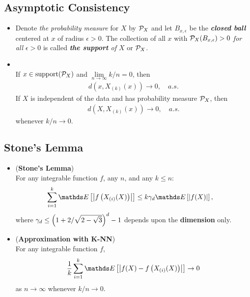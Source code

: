 \documentclass[11pt]{article}
\begin{document}
\subsection{Asymptotic Consistency}
\begin{itemize}
\item \begin{definition}
Denote \emph{the probability measure} for $X$ by ${\mathcal P}_{X}$ and let $B_{x, \epsilon}$ be the \emph{\textbf{closed ball}} centered at $x$ of radius $\epsilon > 0$. The collection of all $x$ with ${\mathcal P}_{X}(B_{x ,\epsilon}) > 0$ \emph{for all} $\epsilon > 0$ is called \emph{\textbf{the support} of $X$} or ${\mathcal P}_{X}$.
\end{definition}

\item \begin{lemma}\citep{devroye2013probabilistic}\\
If $x \in \text{support}({\mathcal P}_{X})$ and $\lim\limits_{n\rightarrow \infty}k/n = 0$, then 
\begin{align*}
d(x,X_{(k)}(x)) \rightarrow 0, \quad a.s.
\end{align*} 
If $X$ is independent of the data and has probability measure ${\mathcal P}_{X}$, then 
\begin{align*}
d(X, X_{(k)}(x)) \rightarrow 0, \quad a.s.
\end{align*}   whenever $k/n \rightarrow 0$.
\end{lemma}
\end{itemize}

\subsection{Stone's Lemma}
\begin{itemize}
\item 
\begin{lemma} (\textbf{Stone's Lemma})  \citep{devroye2013probabilistic}\\
For any integrable function $f$, any $n$, and any $k \le n$:
\begin{align}
\sum_{i=1}^{k}\E{}{\abs{f\paren{X_{(i)}(X)}}} &\le k \gamma_d \E{}{\abs{f(X)}}, \label{eqn: stone_lemma}
\end{align}
where $\gamma_d \le \left(1+ 2/\sqrt{2 - \sqrt{3}}\right)^d - 1$ depends upon the \textbf{dimension} only.
\end{lemma}

\item \begin{lemma} (\textbf{Approximation with K-NN})  \citep{devroye2013probabilistic}\\
For any integrable function $f$,
\begin{align*}
\frac{1}{k}\sum_{i=1}^{k}\E{}{\abs{f(X) - f\paren{X_{(i)}(X)}}} \to 0
\end{align*} as $n \rightarrow \infty$ whenever $k/n \rightarrow 0$.
\end{lemma}
\end{itemize}
\end{document}
